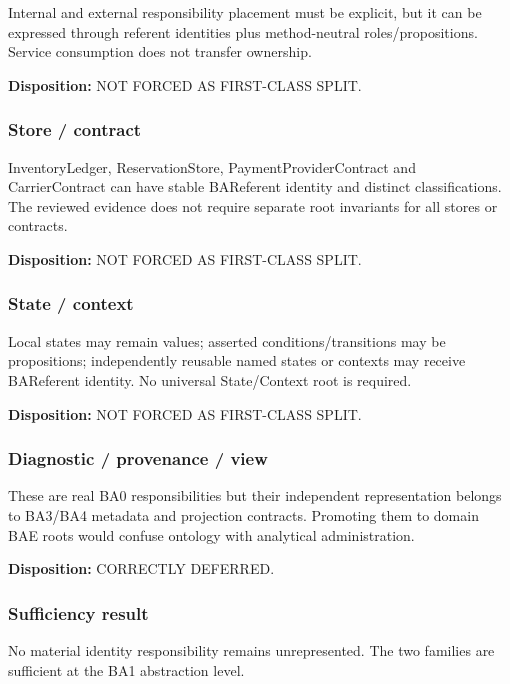 \documentclass[
  10pt,
  a4paper,
]{article}
\begin{document}
Internal and external responsibility placement must be explicit, but it
can be expressed through referent identities plus method-neutral
roles/propositions. Service consumption does not transfer ownership.

\textbf{Disposition:} NOT FORCED AS FIRST-CLASS SPLIT.

\subsubsection{Store / contract}\label{store-contract}

InventoryLedger, ReservationStore, PaymentProviderContract and
CarrierContract can have stable BAReferent identity and distinct
classifications. The reviewed evidence does not require separate root
invariants for all stores or contracts.

\textbf{Disposition:} NOT FORCED AS FIRST-CLASS SPLIT.

\subsubsection{State / context}\label{state-context}

Local states may remain values; asserted conditions/transitions may be
propositions; independently reusable named states or contexts may
receive BAReferent identity. No universal State/Context root is
required.

\textbf{Disposition:} NOT FORCED AS FIRST-CLASS SPLIT.

\subsubsection{Diagnostic / provenance /
view}\label{diagnostic-provenance-view}

These are real BA0 responsibilities but their independent representation
belongs to BA3/BA4 metadata and projection contracts. Promoting them to
domain BAE roots would confuse ontology with analytical administration.

\textbf{Disposition:} CORRECTLY DEFERRED.

\subsubsection{Sufficiency result}\label{sufficiency-result}

No material identity responsibility remains unrepresented. The two
families are sufficient at the BA1 abstraction level.
\end{document}
